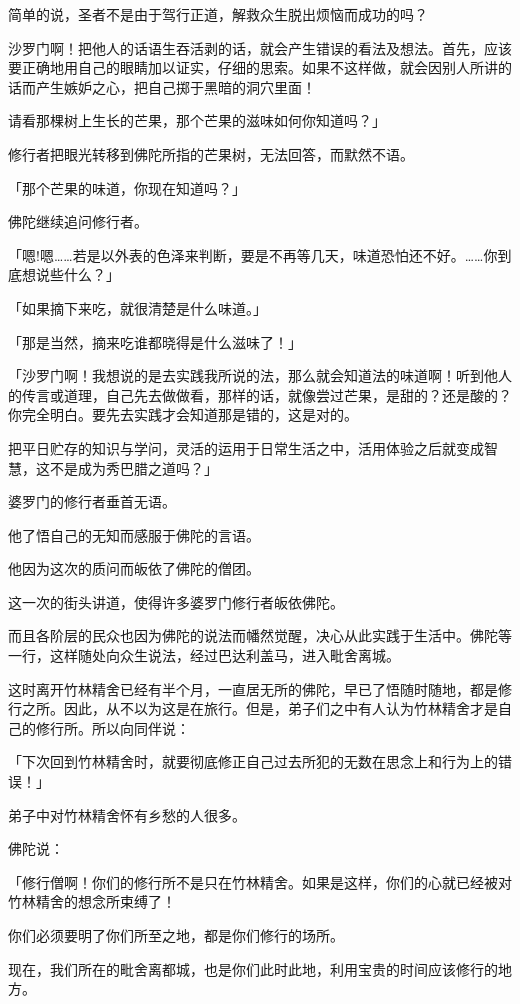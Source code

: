 \documentclass[twoside,openany]{book}
\begin{document}
简单的说，圣者不是由于驾行正道，解救众生脱出烦恼而成功的吗？

沙罗门啊！把他人的话语生吞活剥的话，就会产生错误的看法及想法。首先，应该要正确地用自己的眼睛加以证实，仔细的思索。如果不这样做，就会因别人所讲的话而产生嫉妒之心，把自己掷于黑暗的洞穴里面！

请看那棵树上生长的芒果，那个芒果的滋味如何你知道吗？」

修行者把眼光转移到佛陀所指的芒果树，无法回答，而默然不语。

「那个芒果的味道，你现在知道吗？」

佛陀继续追问修行者。

「嗯!嗯……若是以外表的色泽来判断，要是不再等几天，味道恐怕还不好。……你到底想说些什么？」

「如果摘下来吃，就很清楚是什么味道。」

「那是当然，摘来吃谁都晓得是什么滋味了！」

「沙罗门啊！我想说的是去实践我所说的法，那么就会知道法的味道啊！听到他人的传言或道理，自己先去做做看，那样的话，就像尝过芒果，是甜的？还是酸的？你完全明白。要先去实践才会知道那是错的，这是对的。

把平日贮存的知识与学问，灵活的运用于日常生活之中，活用体验之后就变成智慧，这不是成为秀巴腊之道吗？」

婆罗门的修行者垂首无语。

他了悟自己的无知而感服于佛陀的言语。

他因为这次的质问而皈依了佛陀的僧团。

这一次的街头讲道，使得许多婆罗门修行者皈依佛陀。

而且各阶层的民众也因为佛陀的说法而幡然觉醒，决心从此实践于生活中。佛陀等一行，这样随处向众生说法，经过巴达利盖马，进入毗舍离城。

这时离开竹林精舍已经有半个月，一直居无所的佛陀，早已了悟随时随地，都是修行之所。因此，从不以为这是在旅行。但是，弟子们之中有人认为竹林精舍才是自己的修行所。所以向同伴说：

「下次回到竹林精舍时，就要彻底修正自己过去所犯的无数在思念上和行为上的错误！」

弟子中对竹林精舍怀有乡愁的人很多。

佛陀说：

「修行僧啊！你们的修行所不是只在竹林精舍。如果是这样，你们的心就已经被对竹林精舍的想念所束缚了！

你们必须要明了你们所至之地，都是你们修行的场所。

现在，我们所在的毗舍离都城，也是你们此时此地，利用宝贵的时间应该修行的地方。
\end{document}
